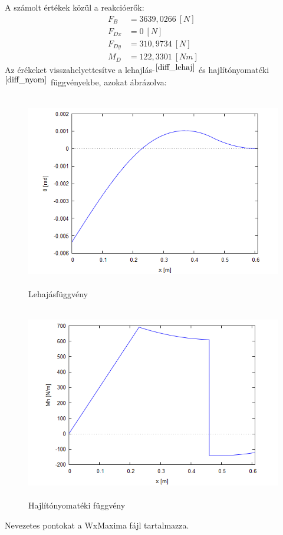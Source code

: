 \documentclass{article}
\begin{document}
		A számolt értékek közül a reakcióerők:
		\begin{align*}
			F_B &= 3639,0266~[N]\\
			F_{Dx} &= 0~[N]\\
			F_{Dy} &= 310,9734~[N]\\
			M_D &= 122,3301~[Nm]
		\end{align*}
		Az érékeket visszahelyettesítve a lehajlás-$^{\ref{diff_lehaj}}$ és hajlítónyomatéki$^{\ref{diff_nyom}}$ függvényekbe, azokat ábrázolva: 
		\begin{figure}[h!]
			\begin{center}
				\includegraphics[height=8.5cm]{images/diff_lehaj}
			\end{center}
			\caption{Lehajásfüggvény}
			\label{diff_lehaj}
		\end{figure}
	\newpage
		\begin{figure}[h!]
			\begin{center}
				\includegraphics[height=8.5cm]{images/diff_nyomatek}
			\end{center}
			\caption{Hajlítónyomatéki függvény}
			\label{diff_nyom}
		\end{figure}
	Nevezetes pontokat a WxMaxima fájl tartalmazza.
\end{document}
